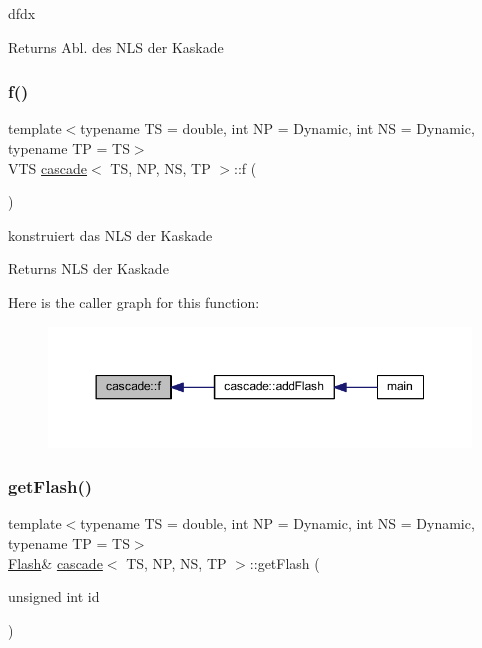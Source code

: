dfdx 

\begin{DoxyReturn}{Returns}
Abl. des N\+LS der Kaskade 
\end{DoxyReturn}
\mbox{\label{classcascade_a9c5bb14ea8b17d1f79c097c6704f1919}} 
\subsubsection{\texorpdfstring{f()}{f()}}
{\footnotesize\ttfamily template$<$typename TS = double, int NP = Dynamic, int NS = Dynamic, typename TP = TS$>$ \\
V\+TS \mbox{\hyperlink{classcascade}{cascade}}$<$ TS, NP, NS, TP $>$\+::f (\begin{DoxyParamCaption}{ }\end{DoxyParamCaption})\hspace{0.3cm}{\ttfamily [inline]}}



konstruiert das N\+LS der Kaskade 

\begin{DoxyReturn}{Returns}
N\+LS der Kaskade 
\end{DoxyReturn}
Here is the caller graph for this function\+:\nopagebreak
\begin{figure}[H]
\begin{center}
\leavevmode
\includegraphics[width=350pt]{classcascade_a9c5bb14ea8b17d1f79c097c6704f1919_icgraph}
\end{center}
\end{figure}
\mbox{\label{classcascade_a1608f0fc7e55bd87b4fc1a109ded71fa}} 
\subsubsection{\texorpdfstring{get\+Flash()}{getFlash()}}
{\footnotesize\ttfamily template$<$typename TS = double, int NP = Dynamic, int NS = Dynamic, typename TP = TS$>$ \\
\mbox{\hyperlink{class_flash}{Flash}}\& \mbox{\hyperlink{classcascade}{cascade}}$<$ TS, NP, NS, TP $>$\+::get\+Flash (\begin{DoxyParamCaption}\item[{unsigned int}]{id }\end{DoxyParamCaption})\hspace{0.3cm}{\ttfamily [inline]}}



